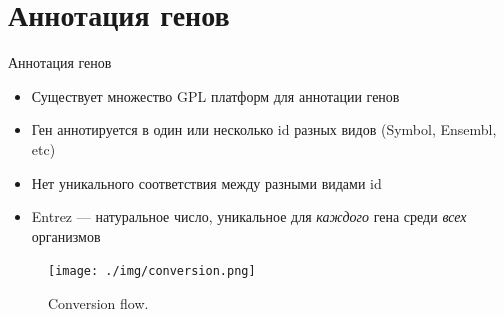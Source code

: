 \documentclass[10pt,pdf,utf8,russian,aspectratio=169]{beamer}
\begin{document}
\section{Аннотация генов}

\begin{frame}{Аннотация генов}
  \begin{itemize}[<+->]
    \item Существует множество GPL платформ для аннотации генов
    \item Ген аннотируется в один или несколько id разных видов (Symbol, Ensembl, etc)
    \item Нет уникального соответствия между разными видами id
    \item Entrez --- натуральное число, уникальное для \emph{каждого} гена среди \emph{всех} организмов
  \end{itemize}
\end{frame}

\begin{frame}
    \begin{figure}[!ht]
        \centering
        \caption{Conversion flow.}
        \texttt{[image: ./img/conversion.png]}
    \end{figure}
\end{frame}
\end{document}
